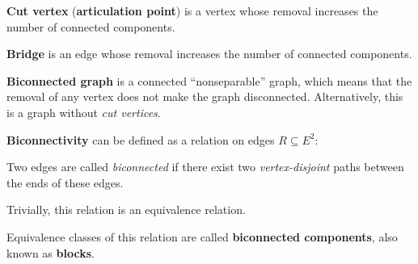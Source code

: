 \documentclass[a4paper,10pt]{article}
\begin{document}
\begin{terms}

    \newpage

    \item \textbf{Cut vertex} (\textbf{articulation point}) is a vertex whose removal increases the number of connected components.

    \item \textbf{Bridge} is an edge whose removal increases the number of connected components.

    \item \textbf{Biconnected graph} is a connected \enquote{nonseparable} graph, which means that the removal of any vertex does not make the graph disconnected. Alternatively, this is a graph without \emph{cut vertices}.

    \item \textbf{Biconnectivity} can be defined as a relation on edges $R \subseteq E^2$:
    \begin{terms}
        \item Two edges are called \emph{biconnected} if there exist two \emph{vertex-disjoint} paths between the ends of these edges.
        \item Trivially, this relation is an equivalence relation.
        \item Equivalence classes of this relation are called \textbf{biconnected components}, also known as \textbf{blocks}.
    \end{terms}


\end{terms}
\end{document}
